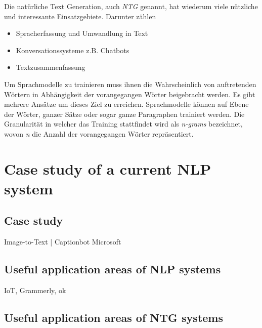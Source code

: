 Die natürliche Text Generation, auch \textit{NTG} genannt, hat wiederum viele nützliche und interessante Einsatzgebiete. Darunter zählen  
\begin{itemize}
\item Spracherfassung und Umwandlung in Text
\item Konversationssysteme z.B. Chatbots
\item Textzusammenfassung
\end{itemize} 

Um Sprachmodelle zu trainieren muss ihnen die Wahrscheinlich von auftretenden Wörtern in Abhängigkeit der vorangegangen Wörter beigebracht werden. Es gibt mehrere Ansätze um dieses Ziel zu erreichen. Sprachmodelle können auf Ebene der Wörter, ganzer Sätze oder sogar ganze Paragraphen trainiert werden. Die Granularität in welcher das Training stattfindet wird als \textit{n-grams} bezeichnet, wovon  \textit{n} die Anzahl der vorangegangen Wörter repräsentiert.

\section{Case study of a current NLP system}

\subsection{Case study}

Image-to-Text | Captionbot Microsoft

\subsection{Useful application areas of NLP systems}

IoT, Grammerly, ok

\subsection{Useful application areas of NTG systems}